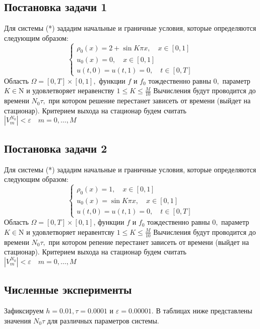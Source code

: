 \documentclass[12pt]{article}
\begin{document}
 \subsection{Постановка задачи 1}
Для системы (*) зададим начальные и граничные условия, которые определяются следующим образом:
$$
\left\{\begin{array}{l}
\rho_{0}(x)=2+\sin K \pi x, \quad x \in[0,1] \\
u_{0}(x)=0, \quad x \in[0,1] \\
u(t, 0)=u(t, 1)=0, \quad t \in[0, T]
\end{array}\right.
$$
Область $\Omega=[0, T] \times[0,1],$ функции $f$ и $f_{0}$ тождественно равны $0,$ параметр $K \in \mathrm{N}$ и удовлетворяет неравенству $1 \leq K \leq \frac{M}{10}$
Вычисления будут проводится до времени $N_{0} \tau,$ при котором решение перестанет зависеть от времени (выйдет на стационар). Критерием выхода на стационар будем считать $\left|V_{m}^{N_{0}}\right|<\varepsilon \quad m=0, \ldots, M$
\subsection{Постановка задачи 2}
Для системы (*) зададим начальные и граничные условия, которые определяются следующим образом:
$$
\left\{\begin{array}{l}
\rho_{0}(x)=1, \quad x \in[0,1] \\
u_{0}(x)=\sin K \pi x, \quad x \in[0,1] \\
u(t, 0)=u(t, 1)=0, \quad t \in[0, T]
\end{array}\right.
$$
Область $\Omega=[0, T] \times[0,1]$, функции $f$ и $f_{0}$ тождественно равны $0,$ параметр $K \in \mathrm{N}$ и удовлетворяет неравентсву $1 \leq K \leq \frac{M}{10}$
Вычисления будут проводится до времени $N_{0} \tau,$ при котором репение перестанет зависеть от времени (выйдет на стационар). Критерием выхода на стационар будем считать $\left|V_{m}^{N_{0}}\right|<\varepsilon \quad m=0, \ldots, M$
\subsection{Численные эксперименты}
Зафиксируем $h=0.01, \tau=0.0001$ и $\varepsilon=0.00001 .$ В таблицах ниже представлены значения $N_{0} \tau$ для различных
параметров системы.
\end{document}
